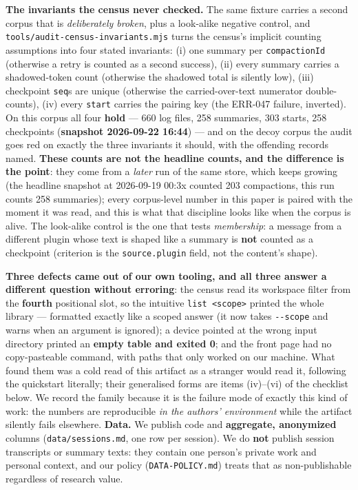 \documentclass[
]{article}
\begin{document}
\textbf{The invariants the census never checked.} The same fixture
carries a second corpus that is \emph{deliberately broken}, plus a
look-alike negative control, and
\texttt{tools/audit-census-invariants.mjs} turns the census's implicit
counting assumptions into four stated invariants: (i) one summary per
\texttt{compactionId} (otherwise a retry is counted as a second
success), (ii) every summary carries a shadowed-token count (otherwise
the shadowed total is silently low), (iii) checkpoint \texttt{seq}s are
unique (otherwise the carried-over-text numerator double-counts), (iv)
every \texttt{start} carries the pairing key (the ERR-047 failure,
inverted). On this corpus all four \textbf{hold} --- 660 log files, 258
summaries, 303 starts, 258 checkpoints (\textbf{snapshot 2026-09-22
16:44}) --- and on the decoy corpus the audit goes red on exactly the
three invariants it should, with the offending records named.
\textbf{These counts are not the headline counts, and the difference is
the point}: they come from a \emph{later} run of the same store, which
keeps growing (the headline snapshot at 2026-09-19 00:3x counted 203
compactions, this run counts 258 summaries); every corpus-level number
in this paper is paired with the moment it was read, and this is what
that discipline looks like when the corpus is alive. The look-alike
control is the one that tests \emph{membership}: a message from a
different plugin whose text is shaped like a summary is \textbf{not}
counted as a checkpoint (criterion is the \texttt{source.plugin} field,
not the content's shape).

\textbf{Three defects came out of our own tooling, and all three answer
a different question without erroring}: the census read its workspace
filter from the \textbf{fourth} positional slot, so the intuitive
\texttt{list\ \textless{}scope\textgreater{}} printed the whole library
--- formatted exactly like a scoped answer (it now takes
\texttt{-\/-scope} and warns when an argument is ignored); a device
pointed at the wrong input directory printed an \textbf{empty table and
exited 0}; and the front page had no copy-pasteable command, with paths
that only worked on our machine. What found them was a cold read of this
artifact as a stranger would read it, following the quickstart
literally; their generalised forms are items (iv)--(vi) of the checklist
below. We record the family because it is the failure mode of exactly
this kind of work: the numbers are reproducible \emph{in the authors'
environment} while the artifact silently fails elsewhere. \textbf{Data.}
We publish code and \textbf{aggregate, anonymized} columns
(\texttt{data/sessions.md}, one row per session). We do \textbf{not}
publish session transcripts or summary texts: they contain one person's
private work and personal context, and our policy
(\texttt{DATA-POLICY.md}) treats that as non-publishable regardless of
research value.
\end{document}
